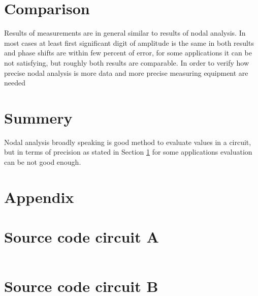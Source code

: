 \documentclass[notitlepage, a4paper, 11pt]{article}
\begin{document}
	\section{Comparison}\label{sec:comparison}
	Results of measurements are in general similar to results of nodal analysis. In most cases at least first significant digit of amplitude is the same in both results and phase shifts are within few percent of error, for some applications it can be not satisfying, but roughly both results are comparable. In order to verify how precise nodal analysis is more data and more precise measuring equipment are needed
	\section{Summery}
	Nodal analysis broadly speaking is good method to evaluate values in a circuit, but in terms of precision as stated in Section \ref{sec:comparison} for some applications evaluation can be not good enough. 
	\newpage
	\appendix
	\section*{Appendix}\label{Appendix}
	\section{Source code circuit A}
	\inputminted{python}{../CircuitA.py}
	\label{code:A}
	\newpage
	\section{Source code circuit B}
	\inputminted{python}{../CircuitB.py}
	\label{code:B}
\end{document}
